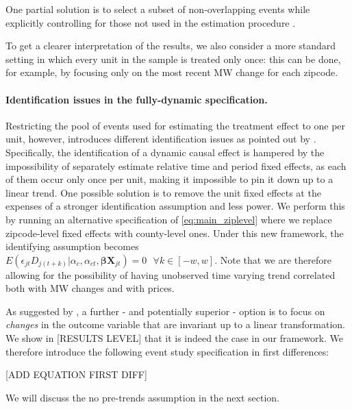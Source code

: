 One partial solution is to select a subset of non-overlapping events while explicitly controlling for those not used in the estimation procedure \parencite{dube2016minimum}. 

To get a clearer interpretation of the results, we also consider a more standard setting in which every unit in the sample is treated only once: this can be done, for example, by focusing only on the most recent MW change for each zipcode.   


\paragraph{Identification issues in the fully-dynamic specification.} Restricting the pool of events used for estimating the treatment effect to one per unit, however, introduces different identification issues as pointed out by \textcite{borusyak2017revisiting}. Specifically, the identification of a dynamic causal effect is hampered by the impossibility of separately estimate relative time and period fixed effects, as each of them occur only once per unit, making it impossible to pin it down up to a linear trend. One possible solution is to remove the unit fixed effects at the expenses of a stronger identification assumption and less power. We perform this by running an alternative specification of \autoref{eq:main_ziplevel} where we replace zipcode-level fixed effects with county-level ones. Under this new framework, the identifying assumption becomes $E \left( \epsilon_{jt} D_{j(t+k)} | \alpha_c, \alpha_{ct}, \boldsymbol{\beta} \boldsymbol{X}_{jt}\right)  = 0  \ \ \ \forall k\in[-w, w]$. Note that we are therefore allowing for the possibility of having unobserved time varying trend correlated both with  MW changes and with prices.  

As suggested by \textcite{borusyak2017revisiting}, a further - and potentially superior - option is to focus on \textit{changes} in the outcome variable that are invariant up to a linear transformation. We show in [RESULTS LEVEL] that it is indeed the case in our framework. We therefore introduce the following event study specification in first differences:

[ADD EQUATION FIRST DIFF]



We will discuss the no pre-trends assumption in the next section.

